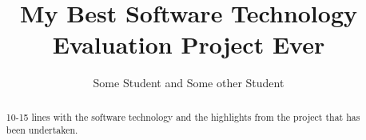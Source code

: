 \documentclass[11pt]{article}
\begin{document}
\title{My Best Software Technology Evaluation Project Ever}

\author{Some Student and Some other Student}

\maketitle

\begin{abstract}

  10-15 lines with the software technology and the highlights from the
  project that has been undertaken.

\end{abstract}

%















{}
\end{document}
